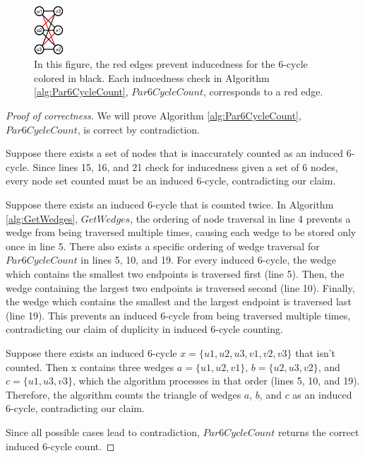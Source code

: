 \documentclass[11pt]{article}
\begin{document}
\begin{figure}[h]
    \centering
    \includegraphics[width=0.1\textwidth]{figures/Inducedness.png}
    \caption{\small In this figure, the red edges prevent inducedness for the 6-cycle colored in black. Each inducedness check in Algorithm \ref{alg:Par6CycleCount}, $Par6CycleCount$, corresponds to a red edge.}
    \label{fig:inducedness}
\end{figure}

\begin{proof}[Proof of correctness]
We will prove Algorithm \ref{alg:Par6CycleCount}, $Par6CycleCount$, is correct by contradiction.

Suppose there exists a set of nodes that is inaccurately counted as an induced 6-cycle.
Since lines 15, 16, and 21 check for inducedness given a set of 6 nodes, every node set counted must be an induced 6-cycle, contradicting our claim.

Suppose there exists an induced 6-cycle that is counted twice.
In Algorithm \ref{alg:GetWedges}, $GetWedges$, the ordering of node traversal in line 4 prevents a wedge from being traversed multiple times, causing each wedge to be stored only once in line 5.
There also exists a specific ordering of wedge traversal for $Par6CycleCount$ in lines 5, 10, and 19.
For every induced 6-cycle, the wedge which contains the smallest two endpoints is traversed first (line 5).
Then, the wedge containing the largest two endpoints is traversed second (line 10).
Finally, the wedge which contains the smallest and the largest endpoint is traversed last (line 19).
This prevents an induced 6-cycle from being traversed multiple times, contradicting our claim of duplicity in induced 6-cycle counting.

Suppose there exists an induced 6-cycle $x = \{u1, u2, u3, v1, v2, v3\}$ that isn't counted.
Then x contains three wedges $a = \{u1, u2, v1\}$, $b = \{u2, u3, v2\}$, and $c = \{u1, u3, v3\}$, which the algorithm processes in that order (lines 5, 10, and 19).
Therefore, the algorithm counts the triangle of wedges $a$, $b$, and $c$ as an induced 6-cycle, contradicting our claim.

Since all possible cases lead to contradiction, $Par6CycleCount$ returns the correct induced 6-cycle count.
\end{proof}
\end{document}
